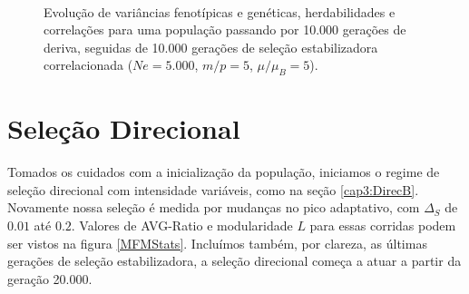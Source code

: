 \begin{figure}[htbp]
   \\
   \caption{Evolução de variâncias fenotípicas e genéticas,
   herdabilidades e correlações para uma população passando por 10.000
gerações de deriva, seguidas de 10.000 gerações de seleção
estabilizadora correlacionada ($Ne = 5.000$, $m/p=5$, $\mu/\mu_B=5$).}
   \label{varBurnin}
\end{figure}


\section{Seleção Direcional}

Tomados os cuidados com a inicialização da população, iniciamos o
regime de seleção direcional com intensidade variáveis, como na seção
\ref{cap3:DirecB}. 
Novamente nossa seleção é medida por mudanças no pico adaptativo, com
$\Delta_S$ de $0.01$ até $0.2$. 
Valores de AVG-Ratio e modularidade $L$ para essas corridas podem ser
vistos na figura \ref{MFMStats}. 
Incluímos também, por clareza, as últimas gerações de seleção
estabilizadora, a seleção direcional começa a atuar a partir da geração
20.000. 

